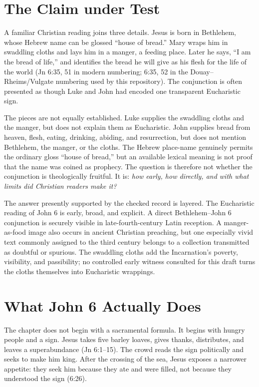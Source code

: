 \hypersetup{pageanchor=true}
\tableofcontents
\clearpage
{}
\begin{deepstudy}

\section{The Claim under Test}

A familiar Christian reading joins three details. Jesus is born in Bethlehem,
whose Hebrew name can be glossed ``house of bread.'' Mary wraps him in
swaddling cloths and lays him in a manger, a feeding place. Later he says, ``I
am the bread of life,'' and identifies the bread he will give as his flesh for
the life of the world (Jn 6:35, 51 in modern numbering; 6:35, 52 in the
Douay--Rheims/Vulgate numbering used by this repository). The conjunction is often presented as
though Luke and John had encoded one transparent Eucharistic sign.

The pieces are not equally established. Luke supplies the swaddling cloths and
the manger, but does not explain them as Eucharistic. John supplies bread from
heaven, flesh, eating, drinking, abiding, and resurrection, but does not mention
Bethlehem, the manger, or the cloths. The Hebrew place-name genuinely permits
the ordinary gloss ``house of bread,'' but an available lexical meaning is not
proof that the name was coined as prophecy. The question is therefore not
whether the conjunction is theologically fruitful. It is: \emph{how early, how
directly, and with what limits did Christian readers make it?}

The answer presently supported by the checked record is layered. The
Eucharistic reading of John 6 is early, broad, and explicit. A direct
Bethlehem--John 6 conjunction is securely visible in late-fourth-century Latin
reception. A manger-as-food image also occurs in ancient Christian preaching,
but one especially vivid text commonly assigned to the third century belongs
to a collection transmitted as doubtful or spurious. The swaddling cloths add
the Incarnation's poverty, visibility, and passibility; no controlled early
witness consulted for this draft turns the cloths themselves into Eucharistic
wrappings.

\section{What John 6 Actually Does}

The chapter does not begin with a sacramental formula. It begins with hungry
people and a sign. Jesus takes five barley loaves, gives thanks, distributes,
and leaves a superabundance (Jn 6:1--15). The crowd reads the sign politically
and seeks to make him king. After the crossing of the sea, Jesus exposes a
narrower appetite: they seek him because they ate and were filled, not because
they understood the sign (6:26).


\end{deepstudy}
